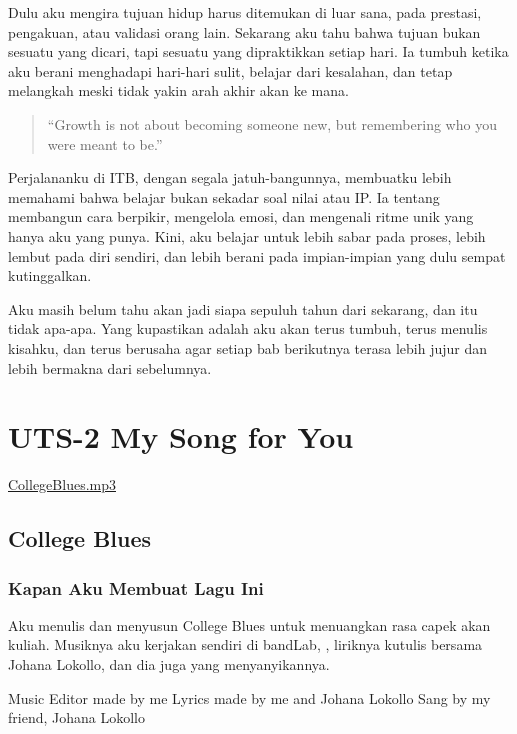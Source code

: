 \documentclass[
  letterpaper,
  DIV=11,
  numbers=noendperiod]{scrreprt}
\begin{document}
Dulu aku mengira tujuan hidup harus ditemukan di luar sana, pada
prestasi, pengakuan, atau validasi orang lain. Sekarang aku tahu bahwa
tujuan bukan sesuatu yang dicari, tapi sesuatu yang dipraktikkan setiap
hari. Ia tumbuh ketika aku berani menghadapi hari-hari sulit, belajar
dari kesalahan, dan tetap melangkah meski tidak yakin arah akhir akan ke
mana.

\begin{quote}
``Growth is not about becoming someone new, but remembering who you were
meant to be.''
\end{quote}

Perjalananku di ITB, dengan segala jatuh-bangunnya, membuatku lebih
memahami bahwa belajar bukan sekadar soal nilai atau IP. Ia tentang
membangun cara berpikir, mengelola emosi, dan mengenali ritme unik yang
hanya aku yang punya. Kini, aku belajar untuk lebih sabar pada proses,
lebih lembut pada diri sendiri, dan lebih berani pada impian-impian yang
dulu sempat kutinggalkan.

Aku masih belum tahu akan jadi siapa sepuluh tahun dari sekarang, dan
itu tidak apa-apa. Yang kupastikan adalah aku akan terus tumbuh, terus
menulis kisahku, dan terus berusaha agar setiap bab berikutnya terasa
lebih jujur dan lebih bermakna dari sebelumnya.


\chapter{UTS-2 My Song for You}\label{uts-2-my-song-for-you}

\url{CollegeBlues.mp3}

\section{College Blues}\label{college-blues}

\subsection{Kapan Aku Membuat Lagu
Ini}\label{kapan-aku-membuat-lagu-ini}

Aku menulis dan menyusun College Blues untuk menuangkan rasa capek akan
kuliah. Musiknya aku kerjakan sendiri di bandLab, , liriknya kutulis
bersama Johana Lokollo, dan dia juga yang menyanyikannya.

Music Editor made by me Lyrics made by me and Johana Lokollo Sang by my
friend, Johana Lokollo
\end{document}
